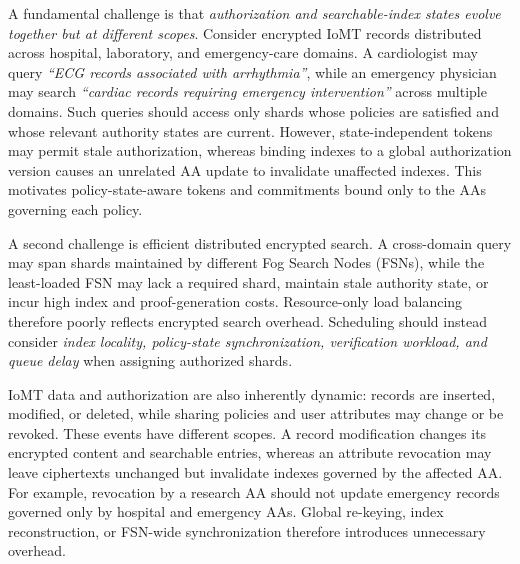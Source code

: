 \documentclass{ieeetj}
\theoremstyle{ieee-style}
\begin{document}
A fundamental challenge is that \emph{authorization and searchable-index
states evolve together but at different scopes}. Consider encrypted IoMT
records distributed across hospital, laboratory, and emergency-care
domains. A cardiologist may query \emph{``ECG records associated with
arrhythmia''}, while an emergency physician may search \emph{``cardiac
records requiring emergency intervention''} across multiple domains.
Such queries should access only shards whose policies are satisfied and
whose relevant authority states are current. However, state-independent
tokens may permit stale authorization, whereas binding indexes to a
global authorization version causes an unrelated AA update to invalidate
unaffected indexes. This motivates policy-state-aware tokens and
commitments bound only to the AAs governing each policy.

A second challenge is efficient distributed encrypted search. A
cross-domain query may span shards maintained by different Fog Search
Nodes (FSNs), while the least-loaded FSN may lack a required shard,
maintain stale authority state, or incur high index and proof-generation
costs. Resource-only load balancing therefore poorly reflects encrypted
search overhead. Scheduling should instead consider \emph{index locality,
policy-state synchronization, verification workload, and queue delay}
when assigning authorized shards.

IoMT data and authorization are also inherently dynamic: records are
inserted, modified, or deleted, while sharing policies and user attributes
may change or be revoked. These events have different scopes. A record
modification changes its encrypted content and searchable entries, whereas
an attribute revocation may leave ciphertexts unchanged but invalidate
indexes governed by the affected AA. For example, revocation by a research
AA should not update emergency records governed only by hospital and
emergency AAs. Global re-keying, index reconstruction, or FSN-wide
synchronization therefore introduces unnecessary overhead.
\end{document}

